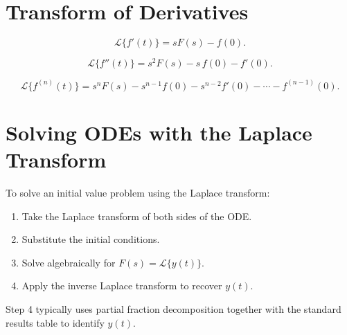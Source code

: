 \section{Transform of Derivatives}

\begin{theorem}
\[
  \mathcal{L}\{f'(t)\} = sF(s) - f(0).
\]
\end{theorem}

\begin{theorem}
\[
  \mathcal{L}\{f''(t)\} = s^2F(s) - s\,f(0) - f'(0).
\]
\end{theorem}

\begin{theorem}[$n$-th Derivative]
\[
  \mathcal{L}\{f^{(n)}(t)\} = s^n F(s) - s^{n-1}f(0) - s^{n-2}f'(0) - \cdots - f^{(n-1)}(0).
\]
\end{theorem}

\section{Solving ODEs with the Laplace Transform}

\begin{theorem}
To solve an initial value problem using the Laplace transform:
\begin{enumerate}
  \item Take the Laplace transform of both sides of the ODE.
  \item Substitute the initial conditions.
  \item Solve algebraically for $F(s) = \mathcal{L}\{y(t)\}$.
  \item Apply the inverse Laplace transform to recover $y(t)$.
\end{enumerate}
\end{theorem}

\begin{remark}
Step 4 typically uses partial fraction decomposition together with the standard
results table to identify $y(t)$.
\end{remark}
